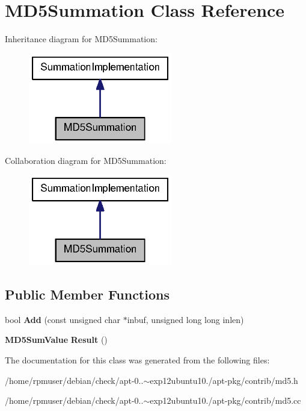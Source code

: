 \section{\-M\-D5\-Summation \-Class \-Reference}
\label{classMD5Summation}


\-Inheritance diagram for \-M\-D5\-Summation\-:
\nopagebreak
\begin{figure}[H]
\begin{center}
\leavevmode
\includegraphics[width=178pt]{classMD5Summation__inherit__graph}
\end{center}
\end{figure}


\-Collaboration diagram for \-M\-D5\-Summation\-:
\nopagebreak
\begin{figure}[H]
\begin{center}
\leavevmode
\includegraphics[width=178pt]{classMD5Summation__coll__graph}
\end{center}
\end{figure}
\subsection*{\-Public \-Member \-Functions}
\begin{DoxyCompactItemize}
\item 
bool {\bfseries \-Add} (const unsigned char $\ast$inbuf, unsigned long long inlen)\label{classMD5Summation_a40d3316c4ec4117ba34228572ea32a65}

\item 
{\bf \-M\-D5\-Sum\-Value} {\bfseries \-Result} ()\label{classMD5Summation_acca152a603e47289752a3e0dd46747f4}

\end{DoxyCompactItemize}


\-The documentation for this class was generated from the following files\-:\begin{DoxyCompactItemize}
\item 
/home/rpmuser/debian/check/apt-\/0..$\sim$exp12ubuntu10./apt-\/pkg/contrib/md5.\-h\item 
/home/rpmuser/debian/check/apt-\/0..$\sim$exp12ubuntu10./apt-\/pkg/contrib/md5.\-cc\end{DoxyCompactItemize}

